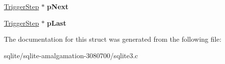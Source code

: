 \begin{DoxyCompactItemize}
\item 
\hypertarget{struct_trigger_step_a0757a0d22dbe2f7f57706014dd35759b}{\hyperlink{struct_trigger_step}{Trigger\+Step} $\ast$ {\bfseries p\+Next}}\label{struct_trigger_step_a0757a0d22dbe2f7f57706014dd35759b}

\item 
\hypertarget{struct_trigger_step_a0aae9ea7f436881c0e9e614476a69584}{\hyperlink{struct_trigger_step}{Trigger\+Step} $\ast$ {\bfseries p\+Last}}\label{struct_trigger_step_a0aae9ea7f436881c0e9e614476a69584}

\end{DoxyCompactItemize}


The documentation for this struct was generated from the following file\+:\begin{DoxyCompactItemize}
\item 
sqlite/sqlite-\/amalgamation-\/3080700/sqlite3.\+c\end{DoxyCompactItemize}
